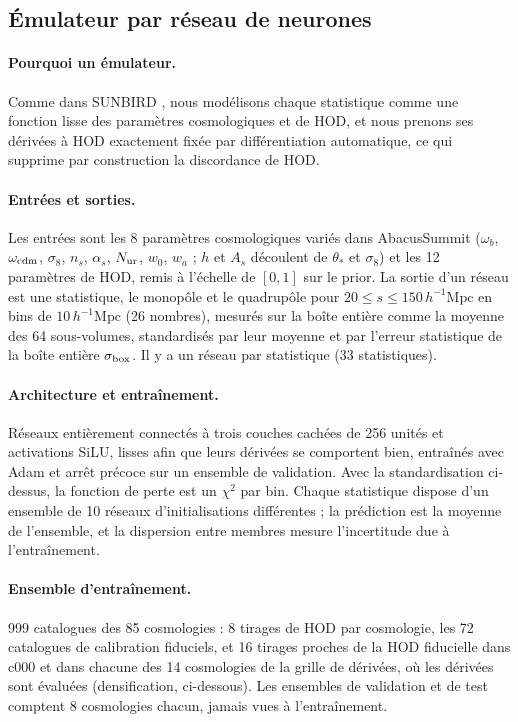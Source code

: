 \documentclass[11pt,twocolumn]{article}
\newcommand{\Mpch}{\,h^{-1}\mathrm{Mpc}}
\begin{document}
\subsection{Émulateur par réseau de neurones}
\label{sec:emulator}

\paragraph{Pourquoi un émulateur.} Comme dans SUNBIRD \cite{CuestaLazaro2024}, nous modélisons chaque statistique comme une fonction lisse des paramètres cosmologiques et de HOD, et nous prenons ses dérivées à HOD exactement fixée par différentiation automatique, ce qui supprime par construction la discordance de HOD.

\paragraph{Entrées et sorties.} Les entrées sont les 8 paramètres cosmologiques variés dans AbacusSummit ($\omega_b$, $\omega_{\rm cdm}$, $\sigma_8$, $n_s$, $\alpha_s$, $N_{\rm ur}$, $w_0$, $w_a$ ; $h$ et $A_s$ découlent de $\theta_*$ et $\sigma_8$) et les 12 paramètres de HOD, remis à l'échelle de $[0,1]$ sur le prior. La sortie d'un réseau est une statistique, le monopôle et le quadrupôle pour $20\le s\le150\Mpch$ en bins de $10\Mpch$ (26 nombres), mesurés sur la boîte entière comme la moyenne des 64 sous-volumes, standardisés par leur moyenne et par l'erreur statistique de la boîte entière $\sigma_{\rm box}$. Il y a un réseau par statistique (33 statistiques).

\paragraph{Architecture et entraînement.} Réseaux entièrement connectés à trois couches cachées de 256 unités et activations SiLU, lisses afin que leurs dérivées se comportent bien, entraînés avec Adam et arrêt précoce sur un ensemble de validation. Avec la standardisation ci-dessus, la fonction de perte est un $\chi^2$ par bin. Chaque statistique dispose d'un ensemble de 10 réseaux d'initialisations différentes ; la prédiction est la moyenne de l'ensemble, et la dispersion entre membres mesure l'incertitude due à l'entraînement.

\paragraph{Ensemble d'entraînement.} 999 catalogues des 85 cosmologies : 8 tirages de HOD par cosmologie, les 72 catalogues de calibration fiduciels, et 16 tirages proches de la HOD fiducielle dans c000 et dans chacune des 14 cosmologies de la grille de dérivées, où les dérivées sont évaluées (densification, ci-dessous). Les ensembles de validation et de test comptent 8 cosmologies chacun, jamais vues à l'entraînement.
\end{document}
